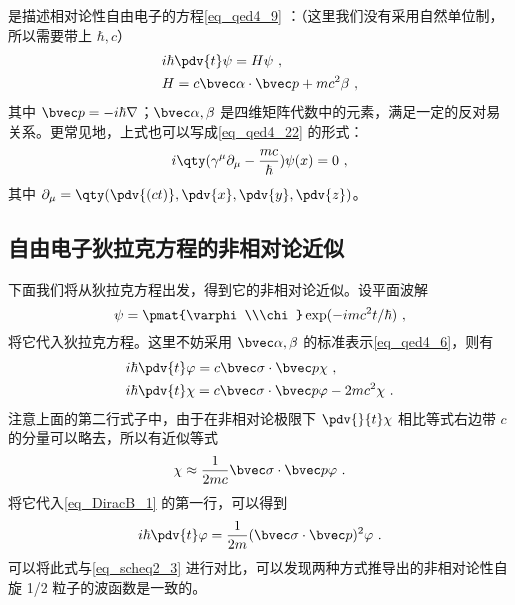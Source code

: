 

是描述相对论性自由电子的方程\autoref{eq_qed4_9} ：（这里我们没有采用自然单位制，所以需要带上 $\hbar,c$）
\begin{equation}
\begin{aligned}
&i\hbar \pdv{t} \psi = H\psi~,\\
&H=c\bvec \alpha\cdot \bvec p+mc^2\beta~,
\end{aligned}
\end{equation}
其中 $\bvec p=-i\hbar\nabla$；$\bvec \alpha,\beta$ 是四维矩阵代数中的元素，满足一定的反对易关系。更常见地，上式也可以写成\autoref{eq_qed4_22}  的形式：
\begin{equation}
i\qty(\gamma^\mu \partial_\mu-\frac{mc}{\hbar})\psi(x)=0~,
\end{equation}
其中 $\partial_\mu=\qty(\pdv{(ct)},\pdv{x},\pdv{y},\pdv{z})$。

\subsection{自由电子狄拉克方程的非相对论近似}

下面我们将从狄拉克方程出发，得到它的非相对论近似。设平面波解
\begin{equation}
\psi=\pmat{\varphi\\\chi}\exp(-imc^2t/\hbar)~,
\end{equation}
将它代入狄拉克方程。这里不妨采用 $\bvec \alpha,\beta$ 的标准表示\autoref{eq_qed4_6}，则有
\begin{equation}\label{eq_DiracB_1}
\begin{aligned}
&i\hbar\pdv{t} \varphi=c\bvec \sigma\cdot \bvec p \chi~,\\
&i\hbar\pdv{t} \chi = c\bvec \sigma\cdot \bvec p \varphi -2mc^2 \chi ~.
\end{aligned}
\end{equation}
注意上面的第二行式子中，由于在非相对论极限下 $\pdv{}{t} \chi$ 相比等式右边带 $c$ 的分量可以略去，所以有近似等式
\begin{equation}\label{eq_DiracB_4}
\chi\approx \frac{1}{2mc} \bvec \sigma\cdot \bvec p \varphi~.
\end{equation}
将它代入\autoref{eq_DiracB_1} 的第一行，可以得到
\begin{equation}\label{eq_DiracB_2}
i\hbar\pdv{t} \varphi=\frac{1}{2m}(\bvec \sigma\cdot \bvec p)^2 \varphi~.
\end{equation}
可以将此式与\autoref{eq_scheq2_3}  进行对比，可以发现两种方式推导出的非相对论性自旋 1/2 粒子的波函数是一致的。

